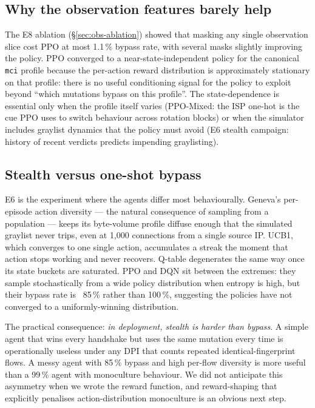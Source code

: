 \documentclass[letterpaper,twocolumn,10pt]{article}
\begin{document}
\subsection{Why the observation features barely help}
The E8 ablation (§\ref{sec:obs-ablation}) showed that masking any
single observation slice cost PPO at most 1.1\,\% bypass rate, with
several masks slightly improving the policy. PPO converged to a
near-state-independent policy for the canonical \texttt{mci} profile
because the per-action reward distribution is approximately
stationary on that profile: there is no useful conditioning signal
for the policy to exploit beyond ``which mutations bypass on this
profile''. The state-dependence is essential only when the profile
itself varies (PPO-Mixed: the ISP one-hot is the cue PPO uses to
switch behaviour across rotation blocks) or when the simulator
includes graylist dynamics that the policy must avoid (E6 stealth
campaign: history of recent verdicts predicts impending
graylisting).

\subsection{Stealth versus one-shot bypass}
E6 is the experiment where the agents differ most behaviourally.
Geneva's per-episode action diversity — the natural consequence of
sampling from a population — keeps its byte-volume profile diffuse
enough that the simulated graylist never trips, even at 1{,}000
connections from a single source IP. UCB1, which converges to one
single action, accumulates a streak the moment that action stops
working and never recovers. Q-table degenerates the same way once
its state buckets are saturated. PPO and DQN sit between the
extremes: they sample stochastically from a wide policy distribution
when entropy is high, but their bypass rate is ~85\,\% rather than
100\,\%, suggesting the policies have not converged to a
uniformly-winning distribution.

The practical consequence: \emph{in deployment, stealth is harder than
bypass}. A simple agent that wins every handshake but uses the same
mutation every time is operationally useless under any DPI that
counts repeated identical-fingerprint flows. A messy agent with
85\,\% bypass and high per-flow diversity is more useful than a 99\,\%
agent with monoculture behaviour. We did not anticipate this
asymmetry when we wrote the reward function, and reward-shaping
that explicitly penalises action-distribution monoculture is an
obvious next step.
\end{document}
